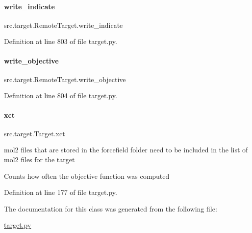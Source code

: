 \paragraph{\texorpdfstring{write\+\_\+indicate}{write\_indicate}}
{\footnotesize\ttfamily src.\+target.\+Remote\+Target.\+write\+\_\+indicate}



Definition at line 803 of file target.\+py.

\mbox{\label{classsrc_1_1target_1_1RemoteTarget_a3b0391aefc69b38f4bc76c7168a60fe5}} 
\paragraph{\texorpdfstring{write\+\_\+objective}{write\_objective}}
{\footnotesize\ttfamily src.\+target.\+Remote\+Target.\+write\+\_\+objective}



Definition at line 804 of file target.\+py.

\mbox{\label{classsrc_1_1target_1_1Target_a399fd456592279c108753f3694950620}} 
\paragraph{\texorpdfstring{xct}{xct}}
{\footnotesize\ttfamily src.\+target.\+Target.\+xct\hspace{0.3cm}{\ttfamily [inherited]}}



mol2 files that are stored in the forcefield folder need to be included in the list of mol2 files for the target 

Counts how often the objective function was computed 

Definition at line 177 of file target.\+py.



The documentation for this class was generated from the following file\+:\begin{DoxyCompactItemize}
\item 
\hyperlink{target_8py}{target.\+py}\end{DoxyCompactItemize}
